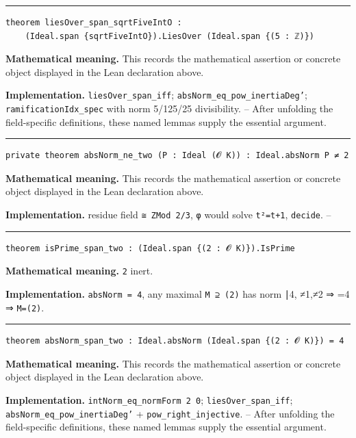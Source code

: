 \documentclass[UTF8,a4paper,11pt,fontset=fandol]{ctexart}
\theoremstyle{definition}
\newcommand{\statementsep}{\par\medskip\hrule\medskip}
\begin{document}
\statementsep
\begin{verbatim}
theorem liesOver_span_sqrtFiveIntO :
    (Ideal.span {sqrtFiveIntO}).LiesOver (Ideal.span {(5 : ℤ)})
\end{verbatim}
\noindent\textbf{Mathematical meaning.} This records the mathematical assertion or concrete object displayed in the Lean declaration above.\par
\noindent\textbf{Implementation.} \texttt{liesOver\_\allowbreak{}span\_\allowbreak{}iff}; \texttt{absNorm\_\allowbreak{}eq\_\allowbreak{}pow\_\allowbreak{}inertiaDeg'}; \texttt{ramificationIdx\_\allowbreak{}spec} with norm 5/125/25 divisibility. -- After unfolding the field-specific definitions, these named lemmas supply the essential argument.\par
\statementsep
\begin{verbatim}
private theorem absNorm_ne_two (P : Ideal (𝓞 K)) : Ideal.absNorm P ≠ 2
\end{verbatim}
\noindent\textbf{Mathematical meaning.} This records the mathematical assertion or concrete object displayed in the Lean declaration above.\par
\noindent\textbf{Implementation.} residue field \texttt{≅ ZMod 2/\allowbreak{}3}, \texttt{φ} would solve \texttt{t²=t+1}, \texttt{decide}. --\par
\statementsep
\begin{verbatim}
theorem isPrime_span_two : (Ideal.span {(2 : 𝓞 K)}).IsPrime
\end{verbatim}
\noindent\textbf{Mathematical meaning.} \texttt{2} inert.\par
\noindent\textbf{Implementation.} \texttt{absNorm = 4}, any maximal \texttt{M ⊇ (2)} has norm ∣4, ≠1,≠2 ⇒ =4 ⇒ \texttt{M=(2)}.\par
\statementsep
\begin{verbatim}
theorem absNorm_span_two : Ideal.absNorm (Ideal.span {(2 : 𝓞 K)}) = 4
\end{verbatim}
\noindent\textbf{Mathematical meaning.} This records the mathematical assertion or concrete object displayed in the Lean declaration above.\par
\noindent\textbf{Implementation.} \texttt{intNorm\_\allowbreak{}eq\_\allowbreak{}normForm 2 0}; \texttt{liesOver\_\allowbreak{}span\_\allowbreak{}iff}; \texttt{absNorm\_\allowbreak{}eq\_\allowbreak{}pow\_\allowbreak{}inertiaDeg'} + \texttt{pow\_\allowbreak{}right\_\allowbreak{}injective}. -- After unfolding the field-specific definitions, these named lemmas supply the essential argument.\par
\end{document}
